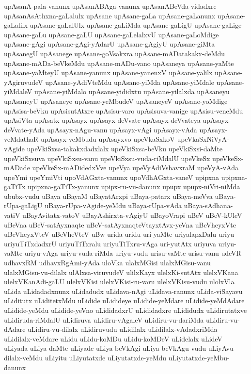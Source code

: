 {upAsanA-pala-vanunx
upAsanABAga-vanunx
upAsanABeVda-vidadxre
upAsanAsAthxna-gaLalulx
upAsane
upAsane-gaLa
upAsane-gaLanunx
upAsane-gaLalilx
upAsane-gaLalUlx
upAsane-gaLiMda
upAsane-gaLigU
upAsane-gaLige
upAsane-gaLu
upAsane-gaLU
upAsane-gaLelalxvU
upAsane-gaLoMdige
upAsane-gAgi
upAsane-gAgi-yAdarU
upAsane-gAgiyU
upAsane-giMta
upAsanegU
upAsanege
upAsane-goVsakxra
upAsane-mADatakakx-deMdu
upAsane-mADa-beVkeMdu
upAsane-mADu-vano
upAsaneya
upAsane-yaMte
upAsane-yaMteyU
upAsane-yanunx
upAsane-yanenxV
upAsane-yalilx
upAsane-yAgiruvudeV
upAsane-yAdiVteMdu
upAsane-yiMda
upAsane-yiMdale
upAsane-yiMdaleV
upAsane-yiMdalo
upAsane-yididxtu
upAsane-yilalxda
upAsaneyu
upAsaneyU
upAsaneye
upAsane-yeMbudeV
upAsaneyeV
upAsane-yoMdige
upAsisa-beVku
upAsisutAtxre
upAsisu-varo
upAsisuva-vanige
upAsisu-veneMdu
upAsiVta
upAsatx
upAsayx
upAsayx-deVvate
upAsayx-deVvateya
upAsayx-deVvate-yAda
upAsayx-nAgu-vanu
upAsayx-vAgi
upAsayx-vAda
upAsayx-veMdathaR
upAsayx-veMbudu
upAsayxvo
upeVkaSxkoV
upeVkaSxNiVyA-vAgide
upeVkiSxsa-takakxdadxlalx
upeVkiSxsa-beVku
upeVkiSxsi-daMte
upeVkiSxsuva
upeVkiSxsu-vanu
upeVkiSxsu-vuda-riMdalU
upeVkeSx
upeVkeSx-mADade
upeVkeSx-mADidedxVve
upeVya
upeVyAdiVshavxraM
upeVyA-vAda
upeYmi
upeYmiVti
upoVdAGxta-vanunx
upoVdhAGxta-vaneV
upipxna
upipxna-gaTiTx
upipxna-gaTiTx-yanunx
upipx-ru-vu-danunx
upupx
upupx-niVri-niMda
ububx-vudu
uBaya
uBayaM
uBayatArxpi
uBaya-patarx
uBaya-meVva
uBaya-rUpa-gaLigU
uBaya-rUpa-vAgide-yeMdu
uBaya-rUpa-vAda
uBaya-sAdhana-vatiV
uBayAvitatx-vatoV
uBayAshirxta-vAgiyU
uBayoVrapi
uBeV
uBeV-kUleV
uBeVna
uBeV-satAyxnaqte
uBeV-satAyxnaqteVtayxtAvx-yeVna
uBeVheyxVte
uBeVheyxVteV
uBeVheVteV
uBw
urida
uridu
uri-yaMte
uriyalapxDalu
uriyu
uriyuTiTxdadxrU
uriyuTiTxralu
uriyuTiTxru-vAga
uri-yutAtx
uriyuva
uriyu-vaMte
uriyu-vAga
uriyu-vuda-riMda
uriyu-vudu
urisu-vaMte
urisu-vanu
udeVR
udhavxRM
udhavxRgAmi-yAda
uloVka
ulalxMGisi
ulalxMGisu-vanu
ulalxMGisu-vu-dilalx
ulAlxsa-viruvudeV
ulilxKayx
ulelxKi-sutAtx
ulelxVKana
ulelxVKanAdi-gaLU
ulelxVKisi
ulelxVKisi-ru-varu
ulelxVKisu-vudu
ulolxVla
uLida
uLidadadxnunx
uLidadudx
uLidava-nAgi
uLidava-ranunx
uLida-viSayavu
uLiditutx
uLiditetxMdu
uLidide
uLidideye
uLidide-yeMdare
uLidide-yeMdAdare
uLidide-yeMdu
uLidide-yeVno
uLididadxrU
uLididadxre
uLididudx
uLidirutatxve
uLidiruda-riMdalU
uLidiruva
uLidiru-vAgaleV
uLidiru-vu-dariMda
uLidiru-vu-dAdare
uLidiru-vu-dilalx
uLidiruvudu
uLidilalx
uLidilalx-vAdadxriMda
uLidilalx-veMdare
uLidu
uLidu-koMDu
uLidu-koMDeV
uLidelalx
uLideV
uLiyada
uLiya-daMte
uLiyade
uLiya-beVkAgi
uLiya-beVkAgu-vudu
uLiyAvu-dilalx-veMdu
uLiyitu
uLiyutatxde
uLiyutatxde-yeMdu
uLiyutatxde-yeMbu-danunx
}
